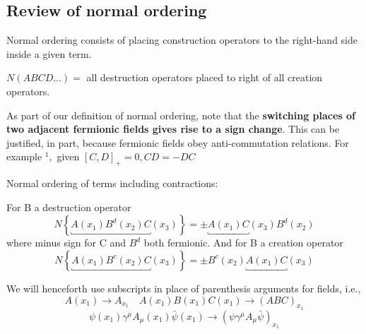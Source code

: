 \subsection{Review of normal ordering}
Normal ordering consists of placing construction operators to the right-hand side inside a given term.
\begin{center}
    $N(A B C D \ldots)=$ all destruction operators placed to right of all creation operators.
\end{center}
As part of our definition of normal ordering, note that the \textbf{switching places of two adjacent fermionic fields gives rise to a sign change}. This can be justified, in part, because fermionic fields obey anti-commutation relations. For example $^{1},$ given $[C, D]_{+}=0, C D=-D C$
\begin{qt}
Normal ordering of terms including contractions:

For B a destruction operator
\begin{equation}
N\left\{\underbracket{A\left(x_{1}\right) B^{d}\left(x_{2}\right) C}\left(x_{3}\right)\right\}=\pm \underbracket{A\left(x_{1}\right) C}\left(x_{3}\right) B^{d}\left(x_{2}\right)
\end{equation}
where minus sign for C and $B^{d}$ both fermionic. And for B a creation operator
\begin{equation}
N\left\{\underbracket{A\left(x_{1}\right) B^{c}\left(x_{2}\right) C}\left(x_{3}\right)\right\}=\pm B^{c}\left(x_{2}\right) \underbracket{A\left(x_{1}\right) C}\left(x_{3}\right)
\end{equation}
\end{qt}
\begin{mybox}
We will henceforth use subscripts in place of parenthesis arguments for fields, i.e.,
$$
A\left(x_{1}\right) \rightarrow A_{x_{1}} \quad A\left(x_{1}\right) B\left(x_{1}\right) C\left(x_{1}\right) \rightarrow(A B C)_{x_{1}}
$$
$$
\psi\left(x_{1}\right) \gamma^{\mu} A_{\mu}\left(x_{1}\right) \bar{\psi}\left(x_{1}\right) \rightarrow\left(\psi \gamma^{\mu} A_{\mu} \bar{\psi}\right)_{x_{1}}
$$
\end{mybox}
